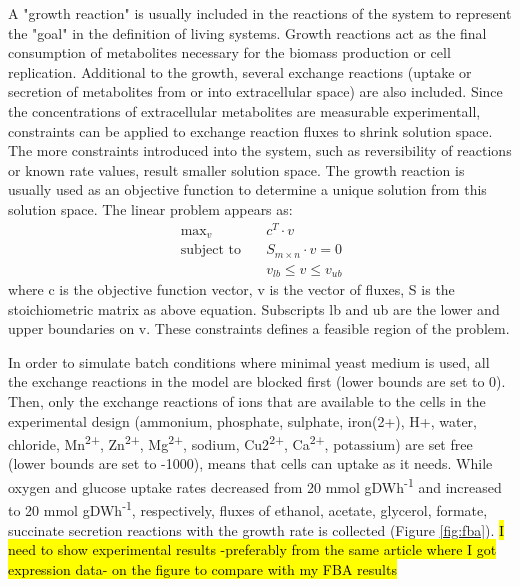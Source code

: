 A "growth reaction" is usually included in the reactions of the system to represent the "goal" in the definition of living systems. Growth reactions act as the final consumption of metabolites necessary for the biomass production or cell replication. Additional to the growth, several exchange reactions (uptake or secretion of metabolites from or into extracellular space) are also included. Since the concentrations of extracellular metabolites are measurable experimentall, constraints can be applied to exchange reaction fluxes to shrink solution space. The more constraints introduced into the system, such as reversibility of reactions or known rate values, result smaller solution space. The growth reaction is usually used as an objective function to determine a unique solution from this solution space. The linear problem appears as:
\begin{equation}
  \begin{align}
  \ \text{max}_v \quad & c^T \cdot v \\
  \ \text{subject to} \quad & S_{m \times n} \cdot v=0 \\
  \ & v_{lb} \leq v \leq v_{ub}
  \label{eq:fba}
  \end{align}
\end{equation}
\noindent where c is the objective function vector, v is the vector of fluxes, S is the stoichiometric matrix as above equation. Subscripts lb and ub are the lower and upper boundaries on v. These constraints defines a feasible region of the problem.

In order to simulate batch conditions where minimal yeast medium is used, all the exchange reactions in the model are blocked first (lower bounds are set to 0). Then, only the exchange reactions of ions that are available to the cells in the experimental design (ammonium, phosphate, sulphate, iron(2+), H+, water, chloride, Mn\textsuperscript{2+}, Zn\textsuperscript{2+}, Mg\textsuperscript{2+}, sodium, Cu2\textsuperscript{2+}, Ca\textsuperscript{2+}, potassium) are set free (lower bounds are set to -1000), means that cells can uptake as it needs. While oxygen and glucose uptake rates decreased from 20 mmol gDWh\textsuperscript{-1} and increased to 20 mmol gDWh\textsuperscript{-1}, respectively, fluxes of ethanol, acetate, glycerol, formate, succinate secretion reactions with the growth rate is collected (Figure \ref{fig:fba}).
\hl{I need to show experimental results -preferably from the same article where I got expression data- on the figure to compare with my FBA results}


